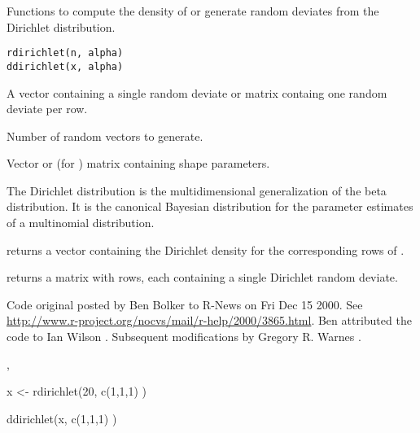 \begin{Description}\relax
Functions to compute the density of or generate random deviates from
the Dirichlet distribution.
\end{Description}
\begin{Usage}
\begin{verbatim}
rdirichlet(n, alpha)
ddirichlet(x, alpha)
\end{verbatim}
\end{Usage}
\begin{Arguments}
\begin{ldescription}
\item[\code{x}] A vector containing a single random deviate or matrix
containg one random deviate per row.
\item[\code{n}] Number of random vectors to generate. 
\item[\code{alpha}] Vector or (for ) matrix containing shape
parameters. 
\end{ldescription}
\end{Arguments}
\begin{Details}\relax
The Dirichlet distribution is the multidimensional generalization of
the beta distribution.  It is the canonical Bayesian distribution for
the parameter estimates of a multinomial distribution.
\end{Details}
\begin{Value}
 returns a vector containing the Dirichlet density for the
corresponding rows of .

 returns a matrix with  rows, each containing
a single Dirichlet random deviate.
\end{Value}
\begin{Author}\relax
Code original posted by Ben Bolker to R-News on Fri Dec 15 2000. See
\url{http://www.r-project.org/nocvs/mail/r-help/2000/3865.html}.  Ben 
attributed the code to Ian Wilson .
Subsequent modifications by Gregory R. Warnes
.
\end{Author}
\begin{SeeAlso}\relax
{}, 
\end{SeeAlso}
\begin{Examples}
\begin{ExampleCode}

  x <- rdirichlet(20, c(1,1,1) )

  ddirichlet(x, c(1,1,1) )

\end{ExampleCode}
\end{Examples}

